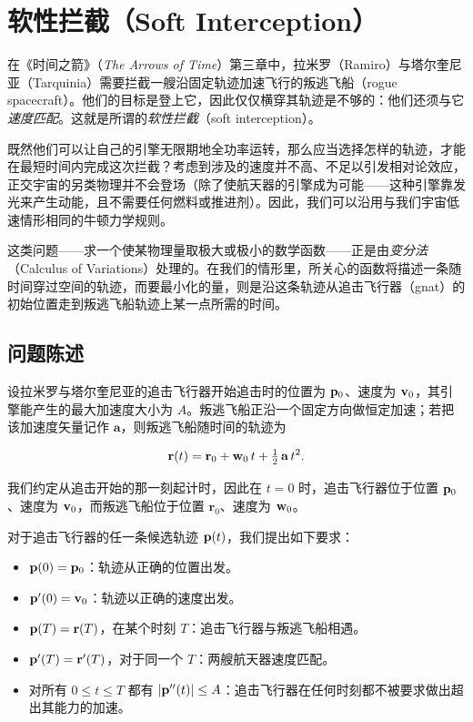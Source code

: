\section{软性拦截（Soft Interception）}

在《时间之箭》（\emph{The Arrows of Time}）第三章中，拉米罗（Ramiro）与塔尔奎尼亚（Tarquinia）需要拦截一艘沿固定轨迹加速飞行的叛逃飞船（rogue spacecraft）。他们的目标是登上它，因此仅仅横穿其轨迹是不够的：他们还须与它\emph{速度匹配}。这就是所谓的\emph{软性拦截}（soft interception）。

既然他们可以让自己的引擎无限期地全功率运转，那么应当选择怎样的轨迹，才能在最短时间内完成这次拦截？考虑到涉及的速度并不高、不足以引发相对论效应，正交宇宙的另类物理并不会登场（除了使航天器的引擎成为可能——这种引擎靠发光来产生动能，且不需要任何燃料或推进剂）。因此，我们可以沿用与我们宇宙低速情形相同的牛顿力学规则。

这类问题——求一个使某物理量取极大或极小的数学函数——正是由\emph{变分法}（Calculus of Variations）处理的。在我们的情形里，所关心的函数将描述一条随时间穿过空间的轨迹，而要最小化的量，则是沿这条轨迹从追击飞行器（gnat）的初始位置走到叛逃飞船轨迹上某一点所需的时间。


\subsection{问题陈述}

设拉米罗与塔尔奎尼亚的追击飞行器开始追击时的位置为 $\mathbf{p}_0$、速度为 $\mathbf{v}_0$，其引擎能产生的最大加速度大小为 $A$。叛逃飞船正沿一个固定方向做恒定加速；若把该加速度矢量记作 $\mathbf{a}$，则叛逃飞船随时间的轨迹为

\begin{equation}
\mathbf{r}(t) = \mathbf{r}_0 + \mathbf{w}_0\,t + \tfrac{1}{2}\,\mathbf{a}\,t^{2} .
\end{equation}

我们约定从追击开始的那一刻起计时，因此在 $t=0$ 时，追击飞行器位于位置 $\mathbf{p}_0$、速度为 $\mathbf{v}_0$，而叛逃飞船位于位置 $\mathbf{r}_0$、速度为 $\mathbf{w}_0$。

对于追击飞行器的任一条候选轨迹 $\mathbf{p}(t)$，我们提出如下要求：

\begin{itemize}
  \item $\mathbf{p}(0)=\mathbf{p}_0$：轨迹从正确的位置出发。
  \item $\mathbf{p}'(0)=\mathbf{v}_0$：轨迹以正确的速度出发。
  \item $\mathbf{p}(T)=\mathbf{r}(T)$，在某个时刻 $T$：追击飞行器与叛逃飞船相遇。
  \item $\mathbf{p}'(T)=\mathbf{r}'(T)$，对于同一个 $T$：两艘航天器速度匹配。
  \item 对所有 $0\le t\le T$ 都有 $|\mathbf{p}''(t)|\le A$：追击飞行器在任何时刻都不被要求做出超出其能力的加速。
\end{itemize}

